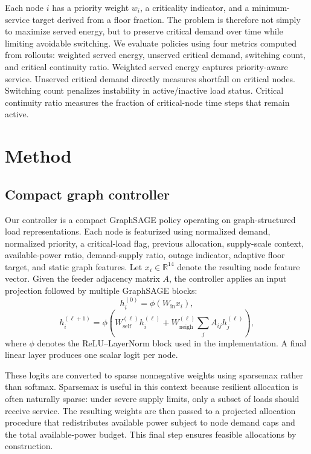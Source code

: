 \documentclass[11pt]{article}
\begin{document}
Each node $i$ has a priority weight $w_i$, a criticality indicator, and a minimum-service target derived from a floor fraction. The problem is therefore not simply to maximize served energy, but to preserve critical demand over time while limiting avoidable switching. We evaluate policies using four metrics computed from rollouts: weighted served energy, unserved critical demand, switching count, and critical continuity ratio. Weighted served energy captures priority-aware service. Unserved critical demand directly measures shortfall on critical nodes. Switching count penalizes instability in active/inactive load status. Critical continuity ratio measures the fraction of critical-node time steps that remain active.

\section{Method}

\subsection{Compact graph controller}

Our controller is a compact GraphSAGE policy operating on graph-structured load representations. Each node is featurized using normalized demand, normalized priority, a critical-load flag, previous allocation, supply-scale context, available-power ratio, demand-supply ratio, outage indicator, adaptive floor target, and static graph features. Let $x_i \in \mathbb{R}^{14}$ denote the resulting node feature vector. Given the feeder adjacency matrix $A$, the controller applies an input projection followed by multiple GraphSAGE blocks:
\begin{equation}
h_i^{(0)} = \phi(W_{\mathrm{in}} x_i),
\end{equation}
\begin{equation}
h_i^{(\ell+1)} = \phi\left(W_{\mathrm{self}}^{(\ell)} h_i^{(\ell)} + W_{\mathrm{neigh}}^{(\ell)} \sum_{j} A_{ij} h_j^{(\ell)}\right),
\end{equation}
where $\phi$ denotes the ReLU--LayerNorm block used in the implementation. A final linear layer produces one scalar logit per node.

These logits are converted to sparse nonnegative weights using sparsemax rather than softmax. Sparsemax is useful in this context because resilient allocation is often naturally sparse: under severe supply limits, only a subset of loads should receive service. The resulting weights are then passed to a projected allocation procedure that redistributes available power subject to node demand caps and the total available-power budget. This final step ensures feasible allocations by construction.
\end{document}
